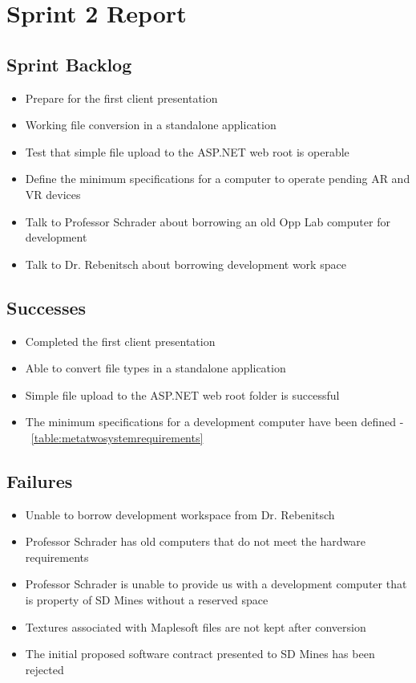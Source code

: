 
\section{Sprint 2 Report}
\label{sec:Sprint2_report}
    \subsection{Sprint Backlog}
    \label{sec:Sprint2_backlog}
    \begin{itemize}
        \item Prepare for the first client presentation
        \item Working file conversion in a standalone application
        \item Test that simple file upload to the ASP.NET web root is operable
        \item Define the minimum specifications for a computer to operate pending AR and VR devices
        \item Talk to Professor Schrader about borrowing an old Opp Lab computer for development
        \item Talk to Dr. Rebenitsch about borrowing development work space 
    \end{itemize}

    \subsection{Successes}
    \label{sec:Sprint2_successes}
        \begin{itemize}
            \item Completed the first client presentation
            \item Able to convert file types in a standalone application
            \item Simple file upload to the ASP.NET web root folder is successful
            \item The minimum specifications for a development computer have been defined - ~\autoref{table:metatwosystemrequirements}
        \end{itemize}

    \subsection{Failures}
    \label{sec:Sprint2_failures}
        \begin{itemize}
            \item Unable to borrow development workspace from Dr. Rebenitsch
            \item Professor Schrader has old computers that do not meet the hardware requirements
            \item Professor Schrader is unable to provide us with a development computer that is 
            property of SD Mines without a reserved space  
            \item Textures associated with Maplesoft files are not kept after conversion
            \item The initial proposed software contract presented to SD Mines has been rejected
        \end{itemize}

